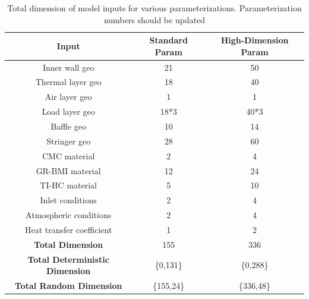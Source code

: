 \documentclass{article}
\begin{document}
\begin{table}
\caption[Dimensions of model inputs]{Total dimension of model inputs for various parameterizations. {\color{red} Parameterization numbers should be updated}}
\label{tab:inputDimension}
\begin{center}
\begin{tabular}[]{ c | c | c }
\textbf{Input} & \textbf{Standard Param} & \textbf{High-Dimension Param} \\ \hline
Inner wall geo & 21 & 50 \\ \hline
Thermal layer geo & 18 & 40 \\ \hline
Air layer geo & 1 & 1 \\ \hline
Load layer geo & 18*3 & 40*3 \\ \hline
Baffle geo & 10 & 14 \\ \hline
Stringer geo & 28 & 60 \\ \hline
CMC material & 2 & 4 \\ \hline
GR-BMI material & 12 & 24 \\ \hline
TI-HC material & 5 & 10 \\ \hline
Inlet conditions & 2 & 4 \\ \hline
Atmospheric conditions & 2 & 4 \\ \hline
Heat transfer coefficient & 1 & 2 \\ \hline \hline
\textbf{Total Dimension} & 155 & 336 \\ \hline
\textbf{Total Deterministic Dimension} & \{0,131\} & \{0,288\} \\ \hline
\textbf{Total Random Dimension} & \{155,24\} & \{336,48\} \\ \hline
\end{tabular}
\end{center}
\end{table}
\end{document}
